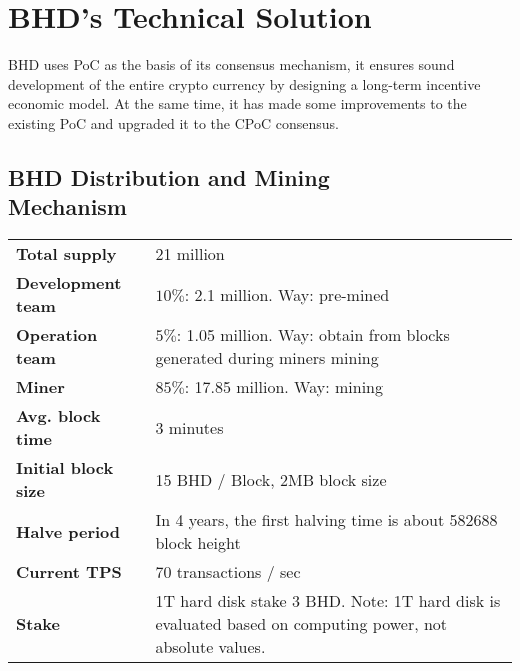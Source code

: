 \chapter{BHD's Technical Solution}
\begin{flushleft}
    BHD uses PoC as the basis of its consensus mechanism, it ensures sound development of the entire crypto currency by designing a long-term incentive economic model. At the same time, it has made some improvements to the existing PoC and upgraded it to the CPoC consensus.
\end{flushleft}
\section{BHD Distribution and Mining\\Mechanism}
\begin{tabular}{ p{4cm} p{8cm} }
    \hline
    \textbf{Total supply}                           & 21 million                                                                                               \\[5pt]
    \rowcolor{lightgray!30}\textbf{Development team}   & $10\%$: 2.1 million. Way: pre-mined                                                                      \\[5pt]
    \textbf{Operation team}                         & $5\%$: 1.05 million. Way: obtain from blocks generated during miners mining                              \\[5pt]
    \rowcolor{lightgray!30}\textbf{Miner}              & $85\%$: 17.85 million. Way: mining                                                                       \\[5pt]
    \textbf{Avg. block time}                        & 3 minutes                                                                                                \\[5pt]
    \rowcolor{lightgray!30}\textbf{Initial block size} & 15 BHD / Block, 2MB block size                                                                           \\[5pt]
    \textbf{Halve period}                           & In 4 years, the first halving time is about 582688 block height                                          \\[5pt]
    \rowcolor{lightgray!30}\textbf{Current TPS}        & 70 transactions / sec                                                                                    \\[5pt]
    \textbf{Stake}                                  & 1T hard disk stake 3 BHD. Note: 1T hard disk is evaluated based on computing power, not absolute values. \\[5pt]
    \hline
\end{tabular}
